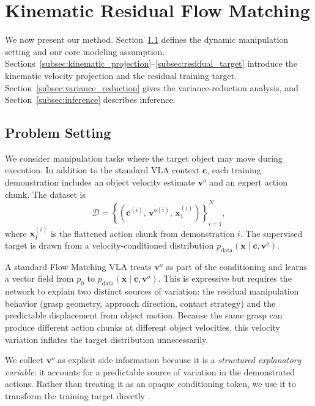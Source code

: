 \documentclass{article} %
\begin{document}
\section{Kinematic Residual Flow Matching}
\label{sec:method}

We now present our method. Section~\ref{subsec:problem_setting} defines the
dynamic manipulation setting and our core modeling assumption.
Sections~\ref{subsec:kinematic_projection}--\ref{subsec:residual_target}
introduce the kinematic velocity projection and the residual training target.
Section~\ref{subsec:variance_reduction} gives the variance-reduction analysis,
and Section~\ref{subsec:inference} describes inference.

\subsection{Problem Setting}
\label{subsec:problem_setting}

We consider manipulation tasks where the target object may move during
execution. In addition to the standard VLA context $\mathbf c$, each training
demonstration includes an object velocity estimate $\mathbf v^{o}$ and an
expert action chunk. The dataset is
\[
    \mathcal D = \left\{
        \left(\mathbf c^{(i)},\, \mathbf v^{o(i)},\, \mathbf x_1^{(i)}\right)
    \right\}_{i=1}^N,
\]
where $\mathbf x_1^{(i)}$ is the flattened action chunk from demonstration $i$.
The supervised target is drawn from a velocity-conditioned distribution
$p_{\mathrm{data}}(\mathbf x \mid \mathbf c, \mathbf v^{o})$.

A standard Flow Matching VLA treats $\mathbf v^{o}$ as part of the conditioning
and learns a vector field from $p_0$ to
$p_{\mathrm{data}}(\mathbf x \mid \mathbf c, \mathbf v^{o})$. This is
expressive but requires the network to explain two distinct sources of
variation: the residual manipulation behavior (grasp geometry, approach
direction, contact strategy) and the predictable displacement from object
motion. Because the same grasp can produce different action chunks at different
object velocities, this velocity variation inflates the target distribution
unnecessarily.

We collect $\mathbf v^{o}$ as explicit side information because it is a
\emph{structured explanatory variable}: it accounts for a predictable source of
variation in the demonstrated actions. Rather than treating it as an opaque
conditioning token, we use it to transform the training target directly
\citep{vapnik2009lupi,chen2020learningbycheating}.
\end{document}

